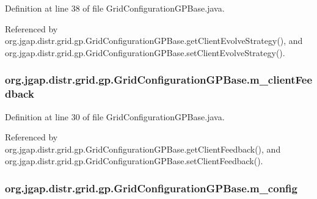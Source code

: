 Definition at line 38 of file Grid\-Configuration\-G\-P\-Base.\-java.



Referenced by org.\-jgap.\-distr.\-grid.\-gp.\-Grid\-Configuration\-G\-P\-Base.\-get\-Client\-Evolve\-Strategy(), and org.\-jgap.\-distr.\-grid.\-gp.\-Grid\-Configuration\-G\-P\-Base.\-set\-Client\-Evolve\-Strategy().

\hypertarget{classorg_1_1jgap_1_1distr_1_1grid_1_1gp_1_1_grid_configuration_g_p_base_a71bf9e73bc1117b36216552648ee01c2}{
\subsubsection[{m\-\_\-client\-Feedback}]{ org.\-jgap.\-distr.\-grid.\-gp.\-Grid\-Configuration\-G\-P\-Base.\-m\-\_\-client\-Feedback\hspace{0.3cm}{\ttfamily [private]}}}\label{classorg_1_1jgap_1_1distr_1_1grid_1_1gp_1_1_grid_configuration_g_p_base_a71bf9e73bc1117b36216552648ee01c2}


Definition at line 30 of file Grid\-Configuration\-G\-P\-Base.\-java.



Referenced by org.\-jgap.\-distr.\-grid.\-gp.\-Grid\-Configuration\-G\-P\-Base.\-get\-Client\-Feedback(), and org.\-jgap.\-distr.\-grid.\-gp.\-Grid\-Configuration\-G\-P\-Base.\-set\-Client\-Feedback().

\hypertarget{classorg_1_1jgap_1_1distr_1_1grid_1_1gp_1_1_grid_configuration_g_p_base_ae6a106f7e93ed359430ddab70f4a0186}{
\subsubsection[{m\-\_\-config}]{ org.\-jgap.\-distr.\-grid.\-gp.\-Grid\-Configuration\-G\-P\-Base.\-m\-\_\-config\hspace{0.3cm}{\ttfamily [private]}}}\label{classorg_1_1jgap_1_1distr_1_1grid_1_1gp_1_1_grid_configuration_g_p_base_ae6a106f7e93ed359430ddab70f4a0186}


